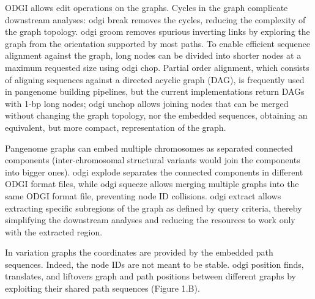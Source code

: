 \documentclass{bioinfo}
\begin{document}
ODGI allows edit operations on the graphs.
Cycles in the graph complicate downstream analyses: odgi break removes the cycles, reducing the complexity of the graph topology.
odgi groom removes spurious inverting links by exploring the graph from the orientation supported by most paths.
To enable efficient sequence alignment against the graph, long nodes can be divided into shorter nodes at a maximum requested size using odgi chop.
Partial order alignment, which consists of aligning sequences against a directed acyclic graph (DAG), is frequently used in pangenome building pipelines, but the current implementations return DAGs with 1-bp long nodes; odgi unchop allows joining nodes that can be merged without changing the graph topology, nor the embedded sequences, obtaining an equivalent, but more compact, representation of the graph.

Pangenome graphs can embed multiple chromosomes as separated connected components (inter-chromosomal structural variants would join the components into bigger ones).
odgi explode separates the connected components in different ODGI format files, while odgi squeeze allows merging multiple graphs into the same ODGI format file, preventing node ID collisions.
odgi extract allows extracting specific subregions of the graph as defined by query criteria, thereby simplifying the downstream analyses and reducing the resources to work only with the extracted region.

In variation graphs the coordinates are provided by the embedded path sequences.
Indeed, the node IDs are not meant to be stable. odgi position finds, translates, and liftovers graph and path positions between different graphs by exploiting their shared path sequences (Figure 1.B).

\begin{comment}
key message of the paper is that we have collected a set of algorithms that enable easy use of pangenome graphs for investigating biology
-> build model solves problem of working with big graphs in memory
-> view (convert to GFA) & paths solve problem of exporting basic features of the graph (e.g. paths)
-> stats (understand basic size / structure) & bin & degree & depth solves problem of understanding the overall structure and size of the graph
-> sort (groom) & layout solves problem of finding latent structure in the pangenome
-> viz & draw provides a human-viewable readout of the graph
-> chop & unchop & squeeze & break & prune & explode lets us break apart or combine the graph nodes and topology
-> position & tips & untangle (jaccard based coordinate conversion) provides a way to map coordinates between any genomes in the graph (e.g. liftover!)
-> extract lets us pull out specific regions of the graph based on path ranges, nodes and positions
\end{comment}
\end{document}
